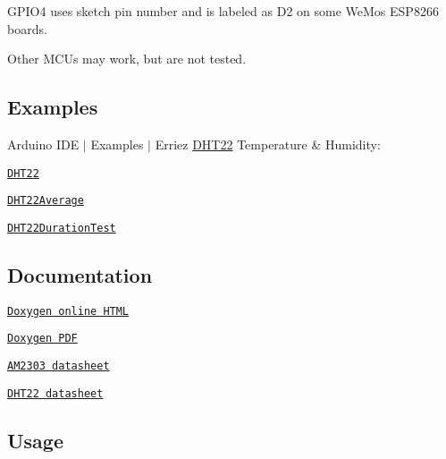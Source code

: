\begin{DoxyItemize}
\item {\ttfamily G\+P\+I\+O4} uses sketch pin number {} and is labeled as {\ttfamily D2} on some We\+Mos E\+S\+P8266 boards.
\item Other M\+CU\textquotesingle{}s may work, but are not tested.
\end{DoxyItemize}

\subsection*{Examples}

Arduino I\+DE $\vert$ Examples $\vert$ Erriez \hyperlink{class_d_h_t22}{D\+H\+T22} Temperature \& Humidity\+:


\begin{DoxyItemize}
\item \href{https://github.com/Erriez/ErriezDHT22/blob/master/examples/DHT22/DHT22.ino}{\tt D\+H\+T22}
\item \href{https://github.com/Erriez/ErriezDHT22/blob/master/examples/DHT22Average/DHT22Average.ino}{\tt D\+H\+T22\+Average}
\item \href{https://github.com/Erriez/ErriezDHT22/blob/master/examples/DHT22DurationTest/DHT22DurationTest.ino}{\tt D\+H\+T22\+Duration\+Test}
\end{DoxyItemize}

\subsection*{Documentation}


\begin{DoxyItemize}
\item \href{https://erriez.github.io/ErriezDHT22}{\tt Doxygen online H\+T\+ML}
\item \href{https://github.com/Erriez/ErriezDHT22/raw/gh-pages/latex/ErriezDHT22.pdf}{\tt Doxygen P\+DF}
\item \href{https://raw.githubusercontent.com/Erriez/ErriezDHT22/master/extras/AM2303_datasheet.pdf}{\tt A\+M2303 datasheet}
\item \href{https://www.google.com/search?q=DHT22+datasheet}{\tt D\+H\+T22 datasheet}
\end{DoxyItemize}

\subsection*{Usage}

